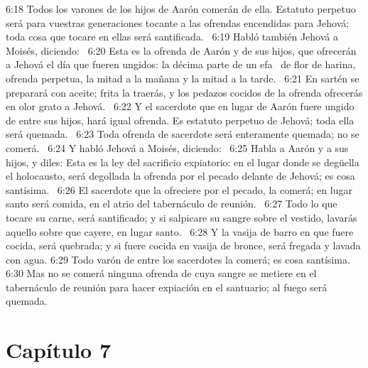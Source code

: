 6:18 Todos los varones de los hijos de Aarón comerán de ella. Estatuto perpetuo será para vuestras generaciones tocante a las ofrendas encendidas para Jehová; toda cosa que tocare en ellas será santificada.  
6:19 Habló también Jehová a Moisés, diciendo:  
6:20 Esta es la ofrenda de Aarón y de sus hijos, que ofrecerán a Jehová el día que fueren ungidos: la décima parte de un efa  de flor de harina, ofrenda perpetua, la mitad a la mañana y la mitad a la tarde.  
6:21 En sartén se preparará con aceite; frita la traerás, y los pedazos cocidos de la ofrenda ofrecerás en olor grato a Jehová.  
6:22 Y el sacerdote que en lugar de Aarón fuere ungido de entre sus hijos, hará igual ofrenda. Es estatuto perpetuo de Jehová; toda ella será quemada.  
6:23 Toda ofrenda de sacerdote será enteramente quemada; no se comerá.  
6:24 Y habló Jehová a Moisés, diciendo:  
6:25 Habla a Aarón y a sus hijos, y diles: Esta es la ley del sacrificio expiatorio: en el lugar donde se degüella el holocausto, será degollada la ofrenda por el pecado delante de Jehová; es cosa santísima.  
6:26 El sacerdote que la ofreciere por el pecado, la comerá; en lugar santo será comida, en el atrio del tabernáculo de reunión.  
6:27 Todo lo que tocare su carne, será santificado; y si salpicare su sangre sobre el vestido, lavarás aquello sobre que cayere, en lugar santo.  
6:28 Y la vasija de barro en que fuere cocida, será quebrada; y si fuere cocida en vasija de bronce, será fregada y lavada con agua. 
6:29 Todo varón de entre los sacerdotes la comerá; es cosa santísima.  
6:30 Mas no se comerá ninguna ofrenda de cuya sangre se metiere en el tabernáculo de reunión para hacer expiación en el santuario; al fuego será quemada.  
\section*{Capítulo 7 }

